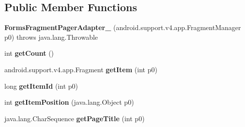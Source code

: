 \subsection*{Public Member Functions}
\begin{DoxyCompactItemize}
\item 
\mbox{\label{classmd5270abb39e60627f0f200893b490a1ade_1_1FormsFragmentPagerAdapter__1_a7ac0bb4a65db4484306e06831a031fed}} 
{\bfseries Forms\+Fragment\+Pager\+Adapter\+\_} (android.\+support.\+v4.\+app.\+Fragment\+Manager p0)  throws java.\+lang.\+Throwable 	
\item 
\mbox{\label{classmd5270abb39e60627f0f200893b490a1ade_1_1FormsFragmentPagerAdapter__1_a99c77886073dcf2434e0cddd4ebe115f}} 
int {\bfseries get\+Count} ()
\item 
\mbox{\label{classmd5270abb39e60627f0f200893b490a1ade_1_1FormsFragmentPagerAdapter__1_acf188451cd28b45334ab835440a9b510}} 
android.\+support.\+v4.\+app.\+Fragment {\bfseries get\+Item} (int p0)
\item 
\mbox{\label{classmd5270abb39e60627f0f200893b490a1ade_1_1FormsFragmentPagerAdapter__1_ad2678a16c4306513316cc5e3f973eb20}} 
long {\bfseries get\+Item\+Id} (int p0)
\item 
\mbox{\label{classmd5270abb39e60627f0f200893b490a1ade_1_1FormsFragmentPagerAdapter__1_a35ec5c3083eb6db927bb57d51c05ed06}} 
int {\bfseries get\+Item\+Position} (java.\+lang.\+Object p0)
\item 
\mbox{\label{classmd5270abb39e60627f0f200893b490a1ade_1_1FormsFragmentPagerAdapter__1_a9e1d408fb9fe541bda794045eea74372}} 
java.\+lang.\+Char\+Sequence {\bfseries get\+Page\+Title} (int p0)
\item 
\mbox{\label{classmd5270abb39e60627f0f200893b490a1ade_1_1FormsFragmentPagerAdapter__1_a1ca53f9ddc8aa628e82b453c1eecc15c}} 

\end{DoxyCompactItemize}

